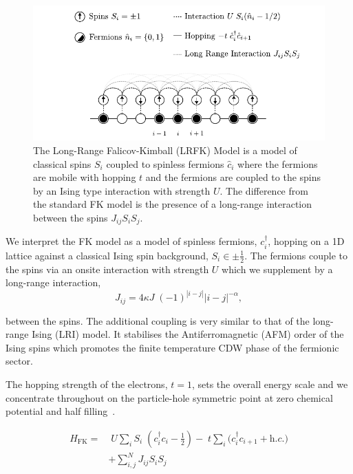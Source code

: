 \hypertarget{fig:lrfk_schematic}{%
\begin{figure}
\centering
\includegraphics[width=1\textwidth,height=\textheight]{figure_code/intro_chapter/lrfk_schematic}
\caption[{Falicov-Kimball Model Diagram}]{The Long-Range Falicov-Kimball (LRFK) Model is a model of classical spins \(S_i\) coupled to spinless fermions \(\hat{c}_i\) where the fermions are mobile with hopping \(t\) and the fermions are coupled to the spins by an Ising type interaction with strength \(U\). The difference from the standard FK model is the presence of a long-range interaction between the spins \(J_{ij}S_i S_j\).}
\label{fig:lrfk_schematic}
\end{figure}
}

We interpret the FK model as a model of spinless fermions, \(c^\dagger_{i}\), hopping on a 1D lattice against a classical Ising spin background, \(S_i \in {\pm \frac{1}{2}}\). The fermions couple to the spins via an onsite interaction with strength \(U\) which we supplement by a long-range interaction, \[
J_{ij} = 4\kappa J\; (-1)^{|i-j|} |i-j|^{-\alpha},
\]

between the spins. The additional coupling is very similar to that of the long-range Ising (LRI) model. It stabilises the Antiferromagnetic (AFM) order of the Ising spins which promotes the finite temperature CDW phase of the fermionic sector.

The hopping strength of the electrons, \(t = 1\), sets the overall energy scale and we concentrate throughout on the particle-hole symmetric point at zero chemical potential and half filling~\autocite{gruberFalicovKimballModelReview1996}.

\[\begin{aligned}
H_{\mathrm{FK}} = & \;U \sum_{i} S_i\;(c^\dagger_{i}c_{i} - \tfrac{1}{2}) -\;t \sum_{i} (c^\dagger_{i}c_{i+1} + \textit{h.c.)}\\ 
 &  + \sum_{i, j}^{N} J_{ij}  S_i S_j
\label{eq:HFK}\end{aligned}\]


